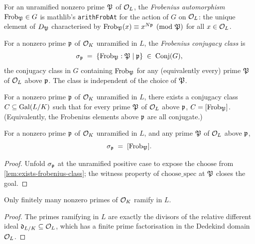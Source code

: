 \begin{definition}\label{def:frobenius-at}
  For an unramified nonzero prime $\mathfrak{P}$ of $\mathcal{O}_L$, the
  \emph{Frobenius automorphism} $\mathrm{Frob}_{\mathfrak{P}}\in G$ is mathlib's
  \texttt{arithFrobAt} for the action of $G$ on $\mathcal{O}_L$: the unique
  element of $D_{\mathfrak{P}}$ characterised by $\mathrm{Frob}_{\mathfrak{P}}(x)\equiv x^{N\mathfrak{p}}\pmod{\mathfrak{P}}$
  for all $x\in\mathcal{O}_L$.
\end{definition}

\begin{definition}\label{def:frobenius-class}
  For a nonzero prime $\mathfrak{p}$ of $\mathcal{O}_K$ unramified in $L$, the
  \emph{Frobenius conjugacy class} is
  \[
    \sigma_{\mathfrak{p}} \;=\; \left\{ \mathrm{Frob}_{\mathfrak{P}} : \mathfrak{P}\mid\mathfrak{p} \right\}
    \;\in\; \mathrm{Conj}(G),
  \]
  the conjugacy class in $G$ containing $\mathrm{Frob}_{\mathfrak{P}}$ for any (equivalently
  every) prime $\mathfrak{P}$ of $\mathcal{O}_L$ above $\mathfrak{p}$. The class is independent
  of the choice of $\mathfrak{P}$.
\end{definition}

\begin{lemma}\label{lem:exists-frobenius-class}
  For a nonzero prime $\mathfrak{p}$ of $\mathcal{O}_K$ unramified in $L$, there exists a
  conjugacy class $C \subseteq \mathrm{Gal}(L/K)$ such that for every prime
  $\mathfrak{P}$ of $\mathcal{O}_L$ above $\mathfrak{p}$, $C = [\mathrm{Frob}_{\mathfrak{P}}]$. (Equivalently, the
  Frobenius elements above $\mathfrak{p}$ are all conjugate.)
\end{lemma}

\begin{lemma}\label{lem:frobenius-class-eq-mk}
  For a nonzero prime $\mathfrak{p}$ of $\mathcal{O}_K$ unramified in $L$, and any prime
  $\mathfrak{P}$ of $\mathcal{O}_L$ above $\mathfrak{p}$,
  \[
    \sigma_{\mathfrak{p}} \;=\; [\mathrm{Frob}_{\mathfrak{P}}].
  \]
\end{lemma}

\begin{proof}
  \leanok
  Unfold $\sigma_{\mathfrak{p}}$ at the unramified positive case to expose the
  $\mathrm{choose}$ from \cref{lem:exists-frobenius-class}; the witness
  property of $\mathrm{choose\_spec}$ at $\mathfrak{P}$ closes the goal.
\end{proof}

\begin{lemma}\label{lem:finite-ramified-primes}
  Only finitely many nonzero primes of $\mathcal{O}_K$ ramify in $L$.
\end{lemma}

\begin{proof}
  The primes ramifying in $L$ are exactly the divisors of the relative
  different ideal $\mathfrak{d}_{L/K}\subseteq\mathcal{O}_L$, which has a
  finite prime factorisation in the Dedekind domain $\mathcal{O}_L$.
\end{proof}
